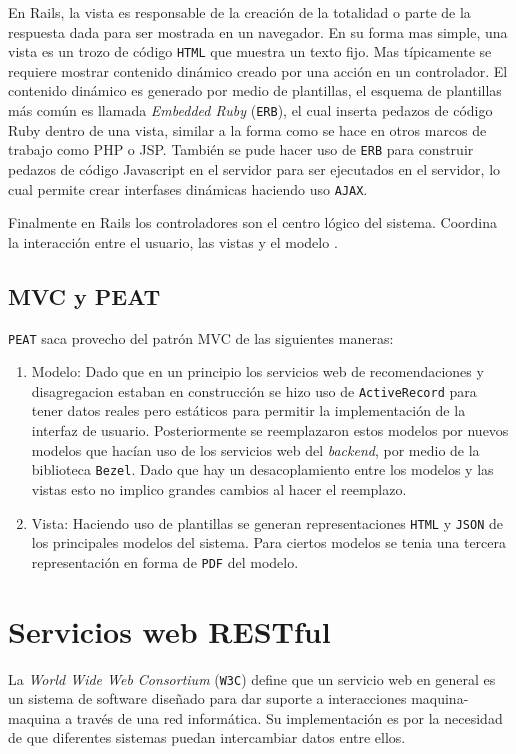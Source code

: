 En Rails, la vista es responsable de la creación de la totalidad o parte de la
respuesta dada para ser mostrada en un navegador. En su forma mas simple, una
vista es un trozo de código \texttt{HTML} que muestra un texto fijo. Mas típicamente
se requiere mostrar contenido dinámico creado por una acción en un controlador.
El contenido dinámico es generado por medio de plantillas, el esquema
de plantillas más común es llamada \textit{Embedded Ruby} (\texttt{ERB}),
el cual inserta pedazos de código Ruby dentro de una vista, similar a la forma
como se hace en otros marcos de trabajo como PHP o JSP. También se pude hacer uso de
\texttt{ERB} para construir pedazos de código Javascript en el servidor
para ser ejecutados en el servidor, lo cual permite crear interfases
dinámicas haciendo uso \texttt{AJAX}.

Finalmente en Rails los controladores son el centro lógico del sistema. Coordina
la interacción entre el usuario, las vistas y el modelo \cite[pag.~29]{15_agile_hansson}.

\subsection{MVC y PEAT}
\texttt{PEAT} saca provecho del patrón MVC de las siguientes maneras:

\begin{enumerate}
\item Modelo: Dado que en un principio los servicios web de recomendaciones y
  disagregacion estaban en construcción se hizo uso de \texttt{ActiveRecord}
  para tener datos reales pero estáticos para permitir la implementación
  de la interfaz de usuario. Posteriormente se reemplazaron estos modelos
  por nuevos modelos que hacían uso de los servicios web del \textit{backend},
  por medio de la biblioteca \texttt{Bezel}. Dado que hay un desacoplamiento
  entre los modelos y las vistas esto no implico grandes cambios al hacer el
  reemplazo.
\item Vista: Haciendo uso de plantillas se generan representaciones \texttt{HTML}
  y \texttt{JSON} de los principales modelos del sistema. Para ciertos modelos se
  tenia una tercera representación en forma de \texttt{PDF} del modelo.
\end{enumerate}

\section{Servicios web RESTful}
La \textit{World Wide Web Consortium} (\texttt{W3C}) define que un servicio web
en general es un sistema de software diseñado para dar suporte a interacciones
maquina-maquina a través de una red informática. Su implementación es por la
necesidad de que diferentes sistemas puedan intercambiar datos entre ellos.

